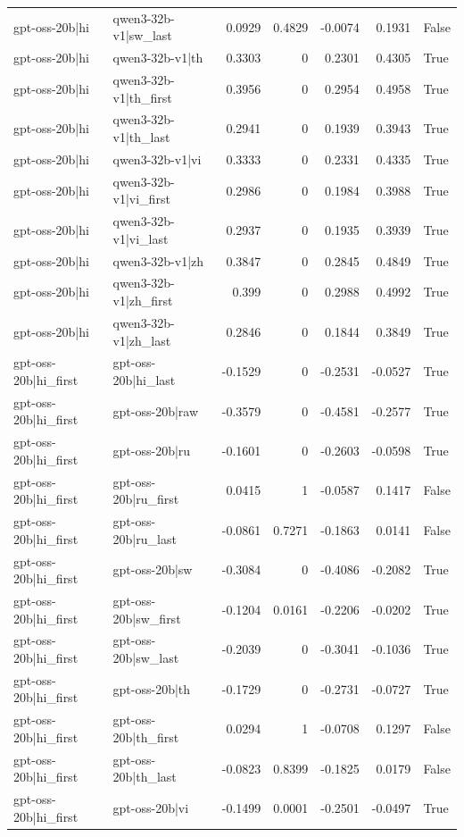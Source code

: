 \begin{table}
\begin{tabular}{l l r r r r l}
gpt-oss-20b|hi & qwen3-32b-v1|sw_last & 0.0929 & 0.4829 & -0.0074 & 0.1931 & False \\
gpt-oss-20b|hi & qwen3-32b-v1|th & 0.3303 & 0 & 0.2301 & 0.4305 & True \\
gpt-oss-20b|hi & qwen3-32b-v1|th_first & 0.3956 & 0 & 0.2954 & 0.4958 & True \\
gpt-oss-20b|hi & qwen3-32b-v1|th_last & 0.2941 & 0 & 0.1939 & 0.3943 & True \\
gpt-oss-20b|hi & qwen3-32b-v1|vi & 0.3333 & 0 & 0.2331 & 0.4335 & True \\
gpt-oss-20b|hi & qwen3-32b-v1|vi_first & 0.2986 & 0 & 0.1984 & 0.3988 & True \\
gpt-oss-20b|hi & qwen3-32b-v1|vi_last & 0.2937 & 0 & 0.1935 & 0.3939 & True \\
gpt-oss-20b|hi & qwen3-32b-v1|zh & 0.3847 & 0 & 0.2845 & 0.4849 & True \\
gpt-oss-20b|hi & qwen3-32b-v1|zh_first & 0.399 & 0 & 0.2988 & 0.4992 & True \\
gpt-oss-20b|hi & qwen3-32b-v1|zh_last & 0.2846 & 0 & 0.1844 & 0.3849 & True \\
gpt-oss-20b|hi_first & gpt-oss-20b|hi_last & -0.1529 & 0 & -0.2531 & -0.0527 & True \\
gpt-oss-20b|hi_first & gpt-oss-20b|raw & -0.3579 & 0 & -0.4581 & -0.2577 & True \\
gpt-oss-20b|hi_first & gpt-oss-20b|ru & -0.1601 & 0 & -0.2603 & -0.0598 & True \\
gpt-oss-20b|hi_first & gpt-oss-20b|ru_first & 0.0415 & 1 & -0.0587 & 0.1417 & False \\
gpt-oss-20b|hi_first & gpt-oss-20b|ru_last & -0.0861 & 0.7271 & -0.1863 & 0.0141 & False \\
gpt-oss-20b|hi_first & gpt-oss-20b|sw & -0.3084 & 0 & -0.4086 & -0.2082 & True \\
gpt-oss-20b|hi_first & gpt-oss-20b|sw_first & -0.1204 & 0.0161 & -0.2206 & -0.0202 & True \\
gpt-oss-20b|hi_first & gpt-oss-20b|sw_last & -0.2039 & 0 & -0.3041 & -0.1036 & True \\
gpt-oss-20b|hi_first & gpt-oss-20b|th & -0.1729 & 0 & -0.2731 & -0.0727 & True \\
gpt-oss-20b|hi_first & gpt-oss-20b|th_first & 0.0294 & 1 & -0.0708 & 0.1297 & False \\
gpt-oss-20b|hi_first & gpt-oss-20b|th_last & -0.0823 & 0.8399 & -0.1825 & 0.0179 & False \\
gpt-oss-20b|hi_first & gpt-oss-20b|vi & -0.1499 & 0.0001 & -0.2501 & -0.0497 & True \\

\end{tabular}
\end{table}
